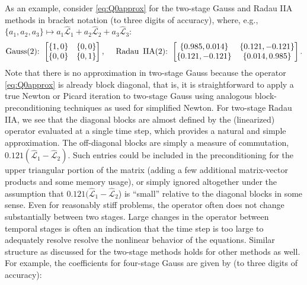 \documentclass[review]{siamart}
\begin{document}
As an example, consider \eqref{eq:Q0approx} for the two-stage Gauss and
Radau IIA methods in bracket notation (to three digits of accuracy),
where, e.g., $\{a_1,a_2,a_3\}\mapsto
a_1\widehat{\mathcal{L}}_1 + a_2\widehat{\mathcal{L}}_2 + a_3\widehat{\mathcal{L}}_3$:
%
\begin{align*}
\textnormal{Gauss(2):} \hspace{1ex}
	\begin{bmatrix}
	\{1,0\} & \{0,0\} \\
	 \{0,0\} & \{0,1\} \\
	\end{bmatrix},
	\hspace{3ex}
\textnormal{Radau\, IIA(2):} \hspace{1ex}
	\begin{bmatrix}
	\{0.985,0.014\} & \{0.121,-0.121\}\\
	\{0.121,-0.121\} & \{0.014,0.985\}\\
	\end{bmatrix}.
\end{align*}
%
Note that there is no approximation in two-stage Gauss because the operator
\eqref{eq:Q0approx} is already block diagonal, that is, it is straightforward to
apply a true Newton or Picard iteration to two-stage Gauss using analogous
block-preconditioning techniques as used for simplified Newton. For two-stage
Radau IIA, we see that the diagonal blocks are almost defined by the
(linearized) operator evaluated at a single time step, which provides a natural
and simple approximation. The off-diagonal blocks are simply a measure of
commutation, $0.121(\widehat{\mathcal{L}}_1 - \widehat{\mathcal{L}}_2)$. Such
entries could be included in the preconditioning for the upper triangular
portion of the matrix (adding a few additional matrix-vector products and some
memory usage), or simply ignored altogether under the assumption that
$0.121(\widehat{\mathcal{L}}_1 - \widehat{\mathcal{L}}_2$) is ``small'' relative
to the diagonal blocks in some sense. Even for reasonably stiff problems, the
operator often does not change substantially between two stages. Large changes
in the operator between temporal stages is often an indication that the time
step is too large to adequately resolve resolve the nonlinear behavior of the
equations. Similar structure as discussed for the two-stage methods holds for
other methods as well. For example, the coefficients for four-stage Gauss are
given by (to three digits of accuracy):
%
\end{document}

